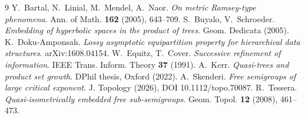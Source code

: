 \documentclass[11pt,a4paper]{article}
\theoremstyle{plain}
\theoremstyle{definition}
\theoremstyle{remark}
\begin{document}
\begin{thebibliography}{9}
 Y.~Bartal, N.~Linial, M.~Mendel, A.~Naor.
  \emph{On metric Ramsey-type phenomena}. Ann. of Math. \textbf{162} (2005), 643--709.
 S.~Buyalo, V.~Schroeder.
  \emph{Embedding of hyperbolic spaces in the product of trees}. Geom. Dedicata (2005).
 K.~Doku-Amponsah.
  \emph{Lossy asymptotic equipartition property for hierarchical data structures}. arXiv:1608.04154.
 W.~Equitz, T.~Cover.
  \emph{Successive refinement of information}. IEEE Trans. Inform. Theory \textbf{37} (1991).
 A.~Kerr. \emph{Quasi-trees and product set growth}. DPhil thesis, Oxford (2022).
 A.~Skenderi. \emph{Free semigroups of large critical exponent}.
  J. Topology (2026), DOI 10.1112/topo.70087.
 R.~Tessera. \emph{Quasi-isometrically embedded free sub-semigroups}.
  Geom. Topol. \textbf{12} (2008), 461--473.
\end{thebibliography}
\end{document}
